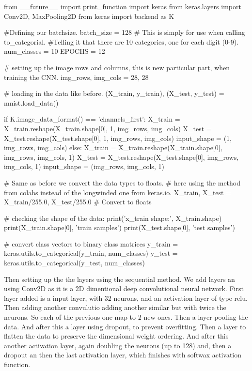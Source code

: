 \documentclass{article}
\begin{document}
\begin{pyminted}
from __future__ import print_function
import keras
from keras.layers import Conv2D, MaxPooling2D
from keras import backend as K

#Defining our batchsize.
batch_size = 128
# This is simply for use when calling to_categorial.
#Telling it that there are 10 categories, one for each digit (0-9).
num_classes = 10
EPOCHS = 12

# setting up the image rows and columns, this is new particular part, when training the CNN.
img_rows, img_cols = 28, 28

# loading in the data like before.
(X_train, y_train), (X_test, y_test) = mnist.load_data()

if K.image_data_format() == 'channels_first':
    X_train = X_train.reshape(X_train.shape[0], 1, img_rows, img_cols)
    X_test = X_test.reshape(X_test.shape[0], 1, img_rows, img_cols)
    input_shape = (1, img_rows, img_cols)
else:
    X_train = X_train.reshape(X_train.shape[0], img_rows, img_cols, 1)
    X_test = X_test.reshape(X_test.shape[0], img_rows, img_cols, 1)
    input_shape = (img_rows, img_cols, 1)

# Same as before we convert the data types to floats.
# here using the method from colabs instead of the longwinded one from keras.io.
X_train, X_test = X_train/255.0, X_test/255.0 # Convert to floats

# checking the shape of the data:
print('x_train shape:', X_train.shape)
print(X_train.shape[0], 'train samples')
print(X_test.shape[0], 'test samples')

# convert class vectors to binary class matrices
y_train = keras.utils.to_categorical(y_train, num_classes)
y_test = keras.utils.to_categorical(y_test, num_classes)
\end{pyminted}

\newpage
\noindent
Then setting up the the layers using the sequential method. We add layers an using Conv2D as it is a 2D dimentional deep convolutional neural network. First layer added is a input layer, with 32 neurons, and an activation layer of type relu. Then adding another convulutio adding another similar but with twice the neurons. So each of the previous one map to 2 new ones. Then a layer pooling the data. And after this a layer using dropout, to prevent overfitting. Then a layer to flatten the data to preserve the dimensional weight ordering. And after this another activation layer, again doubling the neurons (up to 128) and, then a dropout an then the last activation layer, which finishes with softwax activation function.
\end{document}
